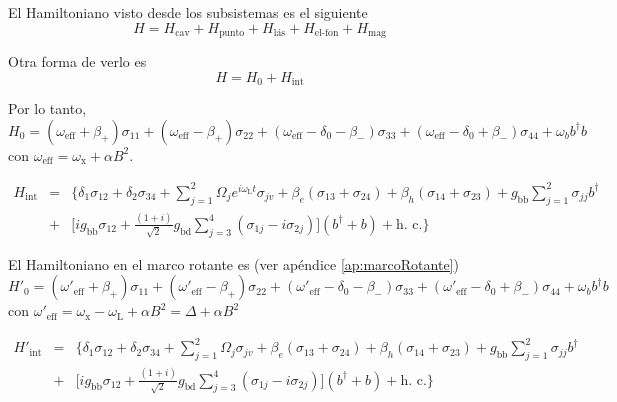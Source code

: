 \documentclass[main.tex]{subfiles}
\begin{document}
El Hamiltoniano visto desde los subsistemas es el siguiente
\begin{equation}
	H = H_\text{cav} + H_\text{punto} + H_\text{l\'as} + H_\text{el-fon} + H_\text{mag}
\end{equation}

Otra forma de verlo es
\begin{equation}
	H = H_0 + H_\text{int}
\end{equation}

Por lo tanto,
\begin{equation}
	H_0 = (\omega_\text{eff} + \beta_+)\sigma_{11} + (\omega_\text{eff} - \beta_+)\sigma_{22} + (\omega_\text{eff} - \delta_0 - \beta_-)\sigma_{33} + (\omega_\text{eff} - \delta_0 + \beta_-)\sigma_{44} + \omega_b b^\dagger b 
\end{equation}
con $\omega_\text{eff} = \omega_\text{x} + \alpha B^2$.

\begin{eqnarray}
	H_\text{int} &=& \Big\{ \delta_1 \sigma_{12} + \delta_2 \sigma_{34} + \sum_{j=1}^2 \Omega_j e^{i\omega_\text{L} t} \sigma_{jv} + \beta_e (\sigma_{13} + \sigma_{24}) + \beta_h (\sigma_{14} + \sigma_{23}) + g_\text{bb} \sum_{j=1}^2 \sigma_{jj} b^\dagger \nonumber \\ &+& \big[ ig_\text{bb}\sigma_{12} + \tfrac{(1+i)}{\sqrt{2}} g_\text{bd} \sum_{j=3}^4 (\sigma_{1j} - i\sigma_{2j}) \big](b^\dagger + b) + \text{h. c.} \Big\}
\end{eqnarray}

El Hamiltoniano en el marco rotante es (ver apéndice \ref{ap:marcoRotante})
\begin{equation}
	H'_0 = (\omega'_\text{eff} + \beta_+)\sigma_{11} + (\omega'_\text{eff} - \beta_+)\sigma_{22} + (\omega'_\text{eff} - \delta_0 - \beta_-)\sigma_{33} + (\omega'_\text{eff} - \delta_0 + \beta_-)\sigma_{44} + \omega_b b^\dagger b
\end{equation}
con $\omega'_\text{eff} = \omega_\text{x} - \omega_\text{L} + \alpha B^2 = \Delta + \alpha B^2$

\begin{eqnarray}
	H'_\text{int} &=& \Big\{ \delta_1 \sigma_{12} + \delta_2 \sigma_{34} + \sum_{j=1}^2 \Omega_j \sigma_{jv} + \beta_e (\sigma_{13} + \sigma_{24}) + \beta_h (\sigma_{14} + \sigma_{23}) + g_\text{bb} \sum_{j=1}^2 \sigma_{jj} b^\dagger \nonumber \\ 
	&+& \big[ ig_\text{bb}\sigma_{12} + \tfrac{(1+i)}{\sqrt{2}} g_\text{bd} \sum_{j=3}^4 (\sigma_{1j} - i\sigma_{2j}) \big](b^\dagger + b) + \text{h. c.} \Big\}
\end{eqnarray}
\end{document}
